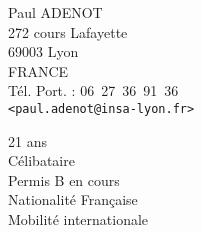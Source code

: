 


\pagestyle{empty}

\begin{minipage}{0.4\textwidth}
\raggedright
{
        Paul ADENOT\\
	272 cours Lafayette\\
        69003 Lyon\\
        FRANCE\\
        Tél. Port. : 06~27~36~91~36\\
        {\tt <paul.adenot@insa-lyon.fr>}\\
}
\end{minipage}
\begin{minipage}{0.5\textwidth}
\raggedleft
{
21 ans\\
Célibataire\\
Permis B en cours\\
Nationalité Française\\
Mobilité internationale\\
}
\end{minipage}

\vfill


\vfill

